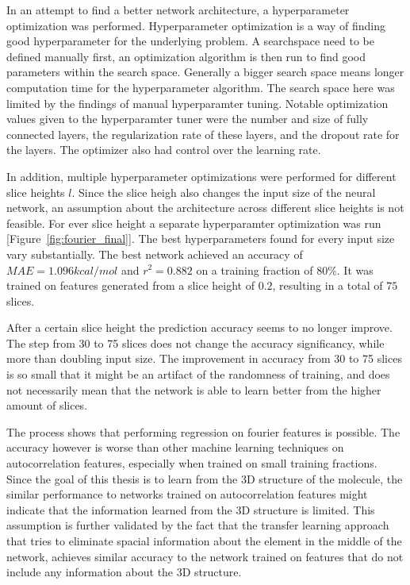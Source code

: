 In an attempt to find a better network architecture, a hyperparameter optimization was performed.
Hyperparameter optimization is a way of finding good hyperparameter for the underlying problem.
A searchspace need to be defined manually first, an optimization algorithm is then run to find good parameters within the search space.
Generally a bigger search space means longer computation time for the hyperparameter algorithm.
The search space here was limited by the findings of manual hyperparamter tuning.
Notable optimization values given to the hyperparamter tuner were the number and size of fully connected layers, the regularization rate of these layers, and the dropout rate for the layers.
The optimizer also had control over the learning rate.



In addition, multiple hyperparameter optimizations were performed for different slice heights $l$.
Since the slice heigh also changes the input size of the neural network, an assumption about the 
architecture across different slice heights is not feasible.
For ever slice height a separate hyperparamter optimization was run [Figure~\ref{fig:fourier_final}].
The best hyperparameters found for every input size vary substantially.
The best network achieved an accuracy of $MAE=1.096 kcal/mol$ and $r^2=0.882$ on a training fraction of 80\%.
It was trained on features generated from a slice height of $0.2$, resulting in a total of $75$ slices.

After a certain slice height the prediction accuracy seems to no longer improve.
The step from 30 to 75 slices does not change the accuracy significancy, while more than doubling input size.
The improvement in accuracy from 30 to 75 slices is so small that it might be an artifact of the 
randomness of training, and does not necessarily mean that the network is able to learn better from the higher amount of slices.


The process shows that performing regression on fourier features is possible.
The accuracy however is worse than other machine learning techniques on autocorrelation features, especially when trained on small training fractions.
Since the goal of this thesis is to learn from the 3D structure of the molecule, the similar performance to networks trained on autocorrelation features
might indicate that the information learned from the 3D structure is limited.
This assumption is further validated by the fact that the transfer learning approach that 
tries to eliminate spacial information about the element in the middle of the network, achieves similar accuracy to the 
network trained on features that do not include any information about the 3D structure.

